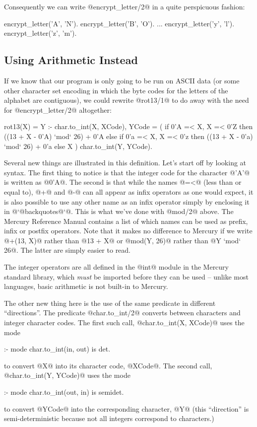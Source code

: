 Consequently we can write @encrypt_letter/2@ in a quite perspicuous
fashion:
\begin{myverbatim}
encrypt_letter('A', 'N').
encrypt_letter('B', 'O').
...
encrypt_letter('y', 'l').
encrypt_letter('z', 'm').
\end{myverbatim}

\subsection{Using Arithmetic Instead}

If we know that our program is only going to be run on ASCII data (or
some other character set encoding in which the byte codes for the
letters of the alphabet are contiguous), we could rewrite @rot13/1@ to
do away with the need for @encrypt_letter/2@ altogether:
\begin{myverbatim}
rot13(X) = Y :-
    char.to_int(X, XCode),
    YCode = ( if      0'A =< X, X =< 0'Z
              then    ((13 + X - 0'A) `mod` 26) + 0'A
              else if 0'a =< X, X =< 0'z
              then    ((13 + X - 0'a) `mod` 26) + 0'a
              else                            X
            )
    char.to_int(Y, YCode).
\end{myverbatim}
Several new things are illustrated in this definition.  Let's start off by
looking at syntax.  The first thing to notice is that the integer code for
the character @'A'@ is written as @0'A@.  The second is that while the names
@=<@ (less than or equal to), @+@ and @-@ can all appear as infix operators
as one would expect, it is also possible to use any other name as an infix
operator simply by enclosing it in @`@backquotes@`@.  This is what we've
done with @mod/2@ above.  The Mercury Reference Manual \XXX{} contains a
list of which names can be used as prefix, infix or postfix operators.  Note
that it makes no difference to Mercury if we write @+(13, X)@ rather than
@13 + X@ or @mod(Y, 26)@ rather than @Y `mod` 26@.  The latter are simply
easier to read.

The integer operators are all defined in the @int@ module in the Mercury
standard library, which \emph{must} be imported before they can be used --
unlike most languages, basic arithmetic is not built-in to Mercury.

The other new thing here is the use of the same predicate in different
``directions''.  The predicate @char.to_int/2@ converts between characters
and integer character codes.  The first such call,
@char.to_int(X, XCode)@ uses the mode
\begin{myverbatim}
:- mode char.to_int(in, out) is det.
\end{myverbatim}
to convert @X@ into its character code, @XCode@.  The second call,
@char.to_int(Y, YCode)@ uses the mode
\begin{myverbatim}
:- mode char.to_int(out, in) is semidet.
\end{myverbatim}
to convert @YCode@ into the corresponding character, @Y@ (this ``direction''
is semi-deterministic because not all integers correspond to characters.)

